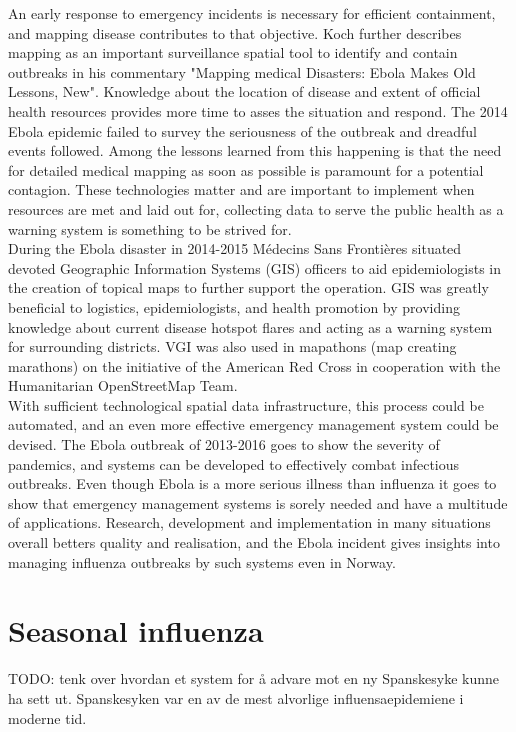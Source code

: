 An early response to emergency incidents is necessary for efficient containment, and mapping disease contributes to that objective. Koch further describes mapping as an important surveillance spatial tool to identify and contain outbreaks in his commentary "Mapping medical Disasters: Ebola Makes Old Lessons, New"\cite{koch2015mapping}. Knowledge about the location of disease and extent of official health resources provides more time to asses the situation and respond. The 2014 Ebola epidemic failed to survey the seriousness of the outbreak and dreadful events followed. Among the lessons learned from this happening is that the need for detailed medical mapping as soon as possible is paramount for a potential contagion. These technologies matter and are important to implement when resources are met and laid out for, collecting data to serve the public health as a warning system is something to be strived for.\\ 

During the Ebola disaster in 2014-2015 Médecins Sans Frontières\cite{gis_support} situated devoted Geographic Information Systems (GIS) officers to aid epidemiologists in the creation of topical maps to further support the operation. GIS was greatly beneficial to logistics, epidemiologists, and health promotion by providing knowledge about current disease hotspot flares and acting as a warning system for surrounding districts. VGI was also used\cite{moeller2015mapping} in mapathons (map creating marathons) on the initiative of the American Red Cross in cooperation with the Humanitarian OpenStreetMap Team.\\ 

With sufficient technological spatial data infrastructure, this process could be automated, and an even more effective emergency management system could be devised. The Ebola outbreak of 2013-2016 goes to show the severity of pandemics, and systems can be developed to effectively combat infectious outbreaks. Even though Ebola is a more serious illness than influenza it goes to show that emergency management systems is sorely needed and have a multitude of applications. Research, development and implementation in many situations overall betters quality and realisation, and the Ebola incident gives insights into managing influenza outbreaks by such systems even in Norway.




\section{Seasonal influenza}
TODO: tenk over hvordan et system for å advare mot en ny Spanskesyke kunne ha sett ut. Spanskesyken var en av de mest alvorlige influensaepidemiene i moderne tid.\\

